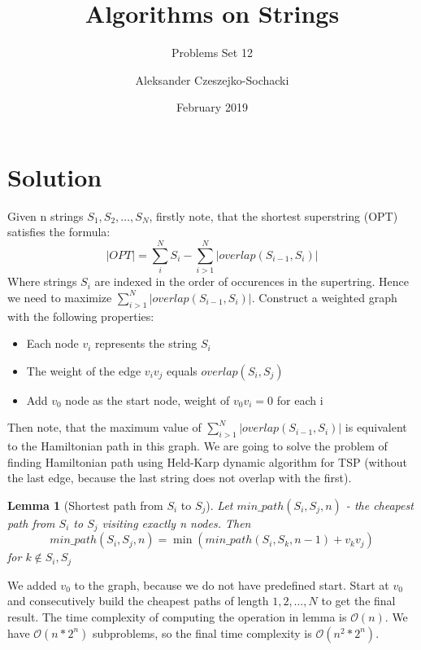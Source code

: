 \documentclass{scrartcl}
\title{Algorithms on Strings}
\subtitle{Problems Set 12}
\author{Aleksander Czeszejko-Sochacki}
\date{February 2019}
\newtheorem{lema}{Lemma}
\begin{document}
\maketitle

\section{Solution}
 Given n strings $S_1, S_2, \dots, S_N$, firstly note, that the shortest superstring (OPT) satisfies the formula:
  \begin{equation}
   |OPT| = \sum_i^NS_i - \sum_{i > 1}^N|overlap(S_{i-1}, S_i)|
  \end{equation}
 Where strings $S_i$ are indexed in the order of occurences in the supertring.
 Hence we need to maximize $\sum_{i > 1}^N|overlap(S_{i-1}, S_i)|$.
 Construct a weighted graph with the following properties:
 \begin{itemize}
  \item Each node $v_i$ represents the string $S_i$
  \item The weight of the edge $v_iv_j$ equals $overlap(S_i, S_j)$
  \item Add $v_0$ node as the start node, weight of $v_0v_i = 0$ for each i
 \end{itemize}
 Then note, that the maximum value of $\sum_{i > 1}^N|overlap(S_{i-1}, S_i)|$
 is equivalent to the Hamiltonian path in this graph. We are going to solve the problem of
 finding Hamiltonian path using Held-Karp dynamic algorithm for TSP (without the last edge, because the
 last string does not overlap with the first).
 
 \begin{lema}[Shortest path from $S_i$ to $S_j$]
  Let $min\_path(S_i, S_j, n)$ - the cheapest path from $S_i$ to $S_j$ visiting exactly n nodes. Then
  \begin{equation}
   min\_path(S_i, S_j, n) = \min(min\_path(S_i, S_k, n-1) + v_kv_j)
  \end{equation}
  for $k \notin {S_i, S_j}$
 \end{lema}

 We added $v_0$ to the graph, because we do not have predefined start. Start at $v_0$ and consecutively
 build the cheapest paths of length $1, 2, \dots, N$ to get the final result. The time complexity of computing the operation in lemma is $\mathcal{O}(n)$. We have $\mathcal{O}(n*2^n)$ subproblems, so the
 final time complexity is $\mathcal{O}(n^2*2^n)$.
 
 
\end{document}
